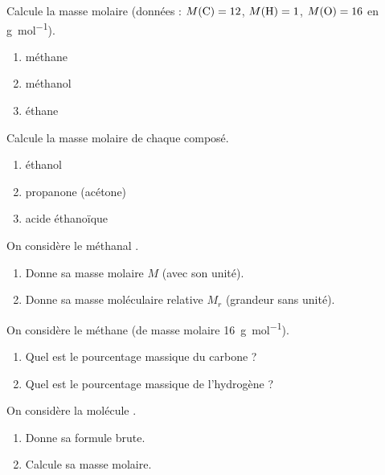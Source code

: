 \documentclass[11pt,a4paper]{article}
\begin{document}
\begin{exo}
Calcule la masse molaire (données : $M(\ce{C})=12$, $M(\ce{H})=1$, $M(\ce{O})=16$ en \si{\gram\per\mole}).
\begin{enumerate}[label=\alph*)]
  \item méthane 
  \item méthanol 
  \item éthane 
\end{enumerate}
\end{exo}

\begin{exo}
Calcule la masse molaire de chaque composé.
\begin{enumerate}[label=\alph*)]
  \item éthanol 
  \item propanone (acétone) 
  \item acide éthanoïque 
\end{enumerate}
\end{exo}

\begin{exo}
On considère le méthanal .
\begin{enumerate}[label=\alph*)]
  \item Donne sa masse molaire $M$ (avec son unité).
  \item Donne sa masse moléculaire relative $M_r$ (grandeur sans unité).
\end{enumerate}
\end{exo}

\begin{exo}
On considère le méthane  (de masse molaire \qty{16}{\gram\per\mole}).
\begin{enumerate}[label=\alph*)]
  \item Quel est le pourcentage massique du carbone ?
  \item Quel est le pourcentage massique de l'hydrogène ?
\end{enumerate}
\end{exo}

\begin{exo}
On considère la molécule .
\begin{enumerate}[label=\alph*)]
  \item Donne sa formule brute.
  \item Calcule sa masse molaire.
\end{enumerate}
\end{exo}
\end{document}
